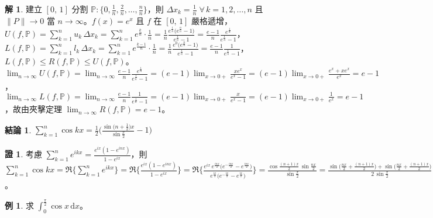 \documentclass[12pt]{extarticle}
\newcommand{\ds}{\displaystyle}
\theoremstyle{definition}
\newtheorem*{fact}{結論}
\newtheorem*{ex}{例}
\newtheorem*{sol}{解}
\newtheorem*{prf}{證}
\begin{document}
\begin{sol}
  建立 $\ds [0,\,1]$ 分割 $\ds\mathbb{P}: \Big\{0, \frac{1}{n}, \frac{2}{n}, \ldots, \frac{n}{n}\Big\}$，則 $\ds\Delta x_k = \frac{1}{n}\;\forall\,k=1,2,\ldots,n$ 且 $\ds\|P\|\to 0$ 當 $n\to\infty$。$f(x) = e^x$ 且 $f$ 在 $[0,\,1]$ 嚴格遞增，$\ds U(f,\mathbb{P}) = \sum_{k=1}^n u_k\,\Delta x_k = \sum_{k=1}^n e^{\frac{k}{n}}\cdot\frac{1}{n} = \frac{1}{n}\frac{e^{\frac{1}{n}}\big(e^{\frac{n}{n}} - 1\big)}{e^{\frac{1}{n}} - 1} = \frac{e - 1}{n}\frac{e^{\frac{1}{n}}}{e^{\frac{1}{n}} - 1}$，$\ds L(f,\mathbb{P}) = \sum_{k=1}^n l_k\,\Delta x_k = \sum_{k=1}^n e^{\frac{k - 1}{n}}\cdot\frac{1}{n} = \frac{1}{n}\frac{e^0\big(e^{\frac{n}{n}} - 1\big)}{e^{\frac{1}{n}} - 1} = \frac{e - 1}{n}\frac{1}{e^{\frac{1}{n}} - 1}$，$\ds L(f,\mathbb{P})\leqslant R(f,\mathbb{P})\leqslant U(f, \mathbb{P})$。$\ds\lim_{n\to\infty} U(f,\mathbb{P}) = \lim_{n\to\infty}\frac{e - 1}{n}\frac{e^{\frac{1}{n}}}{e^{\frac{1}{n}} - 1} = (e - 1)\lim_{x\to 0+}\frac{x e^x}{e^x - 1} = (e - 1)\lim_{x\to 0+}\frac{e^x + x e^x}{e^x} = e - 1$，$\ds\lim_{n\to\infty} L(f,\mathbb{P}) = \lim_{n\to\infty}\frac{e - 1}{n}\frac{1}{e^{\frac{1}{n}} - 1} = (e - 1)\lim_{x\to 0+}\frac{x}{e^x - 1} = (e - 1)\lim_{x\to 0+}\frac{1}{e^x} = e - 1$，故由夾擊定理 $\ds\lim_{n\to\infty} R(f,\mathbb{P}) = e - 1$。
\end{sol}

\begin{fact}
  $\ds\sum_{k = 1}^n \cos kx = \frac{1}{2}\bigg(\frac{\sin\big(n+\frac{1}{2}\big)x}{\sin\frac{x}{2}}-1\bigg)$
\end{fact}

\begin{prf}
  考慮 $\ds\sum_{k = 1}^{n} e^{ikx} = \frac{e^{ix}(1 - e^{inx})}{1 - e^{ix}}$，則 $\ds\sum_{k = 1}^{n} \cos kx = \Re\Big\{\sum_{k = 1}^n e^{ikx}\Big\} = \Re\Big\{\frac{e^{ix}(1 - e^{inx})}{1 - e^{ix}}\Big\} = \Re\bigg\{\frac{e^{ix}\,e^{\frac{inx}{2}}\big(e^{-\frac{inx}{2}} - e^{\frac{inx}{2}}\big)}{e^{\frac{ix}{2}}\big(e^{-\frac{ix}{2}} - e^{\frac{ix}{2}}\big)}\bigg\} = \frac{\cos\frac{(n+1)x}{2}\,\sin\frac{nx}{2}}{\sin\frac{x}{2}} = \frac{\sin\big(\frac{nx}{2} + \frac{(n + 1)x}{2}\big) + \sin\big(\frac{nx}{2} + \frac{(n + 1)x}{2}\big)}{2\,\sin\frac{x}{2}} = \frac{\sin\big(n+\frac{1}{2}\big)x - \sin\frac{x}{2}}{2\,\sin\frac{x}{2}} = \frac{1}{2}\bigg(\frac{\sin\big(n+\frac{1}{2}\big)x}{\sin\frac{x}{2}}-1\bigg)$。 
\end{prf}

\begin{ex}
  求 $\ds\int_0^{\frac{\pi}{2}}\cos x\,\mathrm{d}x$。
\end{ex}
\end{document}
